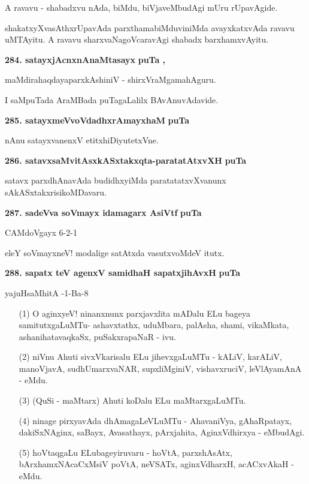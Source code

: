 A ravavu - shabadxvu nAda, biMdu, biVjaveMbudAgi mUru rUpavAgide.

shakatxyXvasAthxrUpavAda parxthamabiMduviniMda avayxkatxvAda ravavu uMTAyitu. A ravavu sharxvaNagoVcaravAgi shabadx barxhamxvAyitu.

\medskip
\noindent
\textbf{284. satayxjAcnxnAnaMtasayx} \hfill{\bf puTa \pageref{81b}, \pageref{103}}

\hfill{maMdirahaqdayaparxkAshiniV - shirxVraMgamahAguru.}

\smallskip
I saMpuTada AraMBada puTagaLalilx BAvAnuvAdavide.

\medskip
\noindent
\textbf{285. satayxmeVvoVdadhxrAmayxhaM} \hfill{\bf puTa \pageref{92}}

\smallskip
nAnu satayxvanenxV etitxhiDiyutetxVne.

\medskip
\noindent
\textbf{286. satavxsaMvitAsxkASxtakxqta-paratatAtxvXH} \hfill{\bf puTa \pageref{48b}}

\smallskip
satavx parxdhAnavAda budidhxyiMda paratatatxvXvanunx sAkASxtakxrisikoMDavaru.

\medskip
\noindent
\textbf{287. sadeVva soVmayx idamagarx AsiVtf} \hfill{\bf puTa \pageref{74}}

\hfill{CAMdoVgayx 6-2-1}

\smallskip
eleY soVmayxneV! modalige satAtxda vasutxvoMdeV itutx.

\medskip
\noindent
\textbf{288. sapatx teV agenxV samidhaH sapatxjihAvxH} \hfill{\bf puTa \pageref{210a}}

\hfill{yajuHsaMhitA -1-Ba-8}

\begin{itemize}
\item[(1)] O aginxyeV! ninanxnunx parxjavxlita mADalu ELu bageya samitutxgaLuMTu- ashavxtathx, uduMbara, palAsha, shami, vikaMkata, ashanihatavaqkaSx, puSakxrapaNaR - ivu.
\item[(2)] niVnu Ahuti sivxVkarisalu ELu jihevxgaLuMTu - kALiV, karALiV, manoVjavA, sudhUmarxvaNAR, supxliMginiV, vishavxruciV, leVlAyamAnA - eMdu.
\item[(3)] (QuSi - maMtarx) Ahuti koDalu ELu maMtarxgaLuMTu.
\item[(4)] ninage pirxyavAda dhAmagaLeVLuMTu - AhavaniVya, gAhaRpatayx, dakiSxNAginx, saBayx, Avasathayx, pArxjahita, AginxVdhirxya - eMbudAgi.
\item[(5)] hoVtaqgaLu ELubageyiruvaru - hoVtA, parxshAsAtx, bArxhamxNAcaCxMsiV poVtA, neVSATx, aginxVdharxH, acACxvAkaH - eMdu.
\end{itemize}


